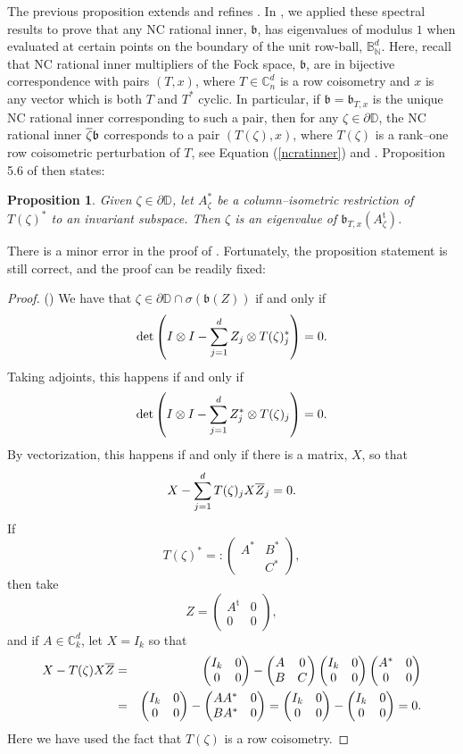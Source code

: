 \documentclass{article}
\newtheorem*{prop*}{Proposition}
\theoremstyle{definition}
\theoremstyle{remark}
\numberwithin{equation}{section}
\def\ba{\begin{eqnarray*}}
\def\ea{\end{eqnarray*}}
\newcommand{\bpm}{\begin{pmatrix}}
\newcommand{\epm}{\end{pmatrix}}
\newcommand{\mr}{\ensuremath{\mathrm}}
\newcommand{\ov}{\ensuremath{\overline}}
\def\C{\mathbb{C}}
\def\D{\mathbb{D}}
\def\N{\mathbb{N}}
\def\B{\mathbb{B}}
\def\fb{\mathfrak{b}}
\def\mrt{\mathrm{t}}
\begin{document}
The previous proposition extends and refines \cite[Proposition 5.5]{JMS-ncratClark}. In \cite[Proposition 5.6]{JMS-ncratClark}, we applied these spectral results to prove that any NC rational inner, $\fb$, has eigenvalues of modulus $1$ when evaluated at certain points on the boundary of the unit row-ball, $\B ^d _\N$. Here, recall that NC rational inner multipliers of the Fock space, $\fb$, are in bijective correspondence with pairs $(T,x)$, where $T \in \C ^d _n$ is a row coisometry and $x$ is any vector which is both $T$ and $T^*$ cyclic. In particular, if $\fb = \fb _{T,x}$ is the unique NC rational inner corresponding to such a pair, then for any $\zeta \in \partial \D$, the NC rational inner $\ov{\zeta} \fb$ corresponds to a pair $(T(\zeta ), x)$, where $T(\zeta)$ is a rank--one row coisometric perturbation of $T$, see Equation (\ref{ncratinner}) and \cite[Theorem 4.1]{JMS-ncratClark}. Proposition 5.6 of \cite{JMS-ncratClark} then states:

\begin{prop*}
Given $\zeta \in \partial \D$, let $A_\zeta ^*$ be a column--isometric restriction of $T(\zeta ) ^*$ to an invariant subspace. Then $\zeta$ is an eigenvalue of $\fb _{T,x} (A_\zeta ^\mrt )$.
\end{prop*}

There is a minor error in the proof of \cite[Proposition 5.6]{JMS-ncratClark}. Fortunately, the proposition statement is still correct, and the proof can be readily fixed: 

\begin{proof}{ (\cite[Proposition 5.6]{JMS-ncratClark})}
We have that $\zeta \in \partial \D \cap \sigma (\fb (Z) )$ if and only if 
$$ \mr{det} \left( I \otimes I - \sum_{j=1}^d Z_j \otimes T(\zeta )_j ^* \right) =0. $$ Taking adjoints, this happens if and only if 
$$ \mr{det} \left( I \otimes I - \sum_{j=1}^d Z_j^* \otimes T(\zeta)_j \right) =0. $$ By vectorization, this happens if and only if there is a matrix, $X$, so that 
$$ X - \sum_{j=1}^d T(\zeta )_j X \ov{Z}_j =0. $$ If 
$$ T(\zeta ) ^* =: \bpm A^* & B^* \\  & C^* \epm, $$ then take 
$$ Z  = \bpm A^\mrt  &  0 \\ 0 & 0 \epm, $$ and if $A \in \C ^d _k$, let $X = I_k$ so that 
\ba  X - T(\zeta ) X \ov{Z} & = & \bpm I_k & 0 \\ 0 & 0 \epm - \bpm A & 0 \\ B & C \epm \bpm I_k & 0 \\ 0 & 0 \epm \bpm A^* & 0 \\ 0 & 0 \epm \\
& = & \bpm I_k & 0 \\ 0 & 0 \epm - \bpm AA ^* & 0 \\ BA^* & 0 \epm = \bpm I_k & 0 \\ 0 & 0 \epm - \bpm I_k & 0 \\ 0 & 0 \epm =0. \ea 
Here we have used the fact that $T(\zeta)$ is a row coisometry.
\end{proof}
\end{document}
